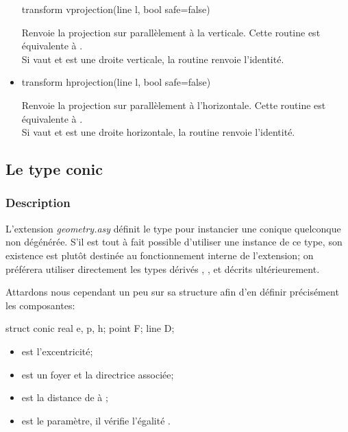\documentclass[pdftex]{article}
\newcommand{\Geo}{L'extension \emph{geometry.asy}\xspace}
\begin{document}
\begin{itemize}
  \begin{Vcolor}
    transform vprojection(line l, bool safe=false)
  \end{Vcolor}
  Renvoie la projection sur  parallèlement à la verticale.
  Cette routine est équivalente à .\\
  Si  vaut  et  est une droite
  verticale, la routine renvoie l'identité.
\item {}
  \begin{Vcolor}
    transform hprojection(line l, bool safe=false)
  \end{Vcolor}
  Renvoie la projection sur  parallèlement à l'horizontale.
  Cette routine est équivalente à .\\
  Si  vaut  et  est une droite
  horizontale, la routine renvoie l'identité.
\end{itemize}

\subsection{Le type \texorpdfstring{\og{}conic\fg{}}{«conic»}}
\subsubsection{Description}
\Geo définit le type  pour instancier une conique
quelconque non dégénérée. S'il est tout à fait possible
d'utiliser une instance de ce type, son existence est
plutôt destinée au fonctionnement interne de l'extension; on préférera
utiliser directement les types dérivés , ,
 et  décrits ultérieurement.

Attardons nous cependant un peu sur sa structure afin d'en définir
précisément les composantes:
\begin{center}
  \begin{Vcolor}
    struct conic { real e, p, h; point F; line D; }
  \end{Vcolor}
\end{center}
\begin{itemize}
\item {} est l'excentricité;
\item {} est un foyer et  la directrice associée;
\item {} est la distance de  à ;
\item {} est le paramètre, il vérifie l'égalité .
\end{itemize}
\end{document}
